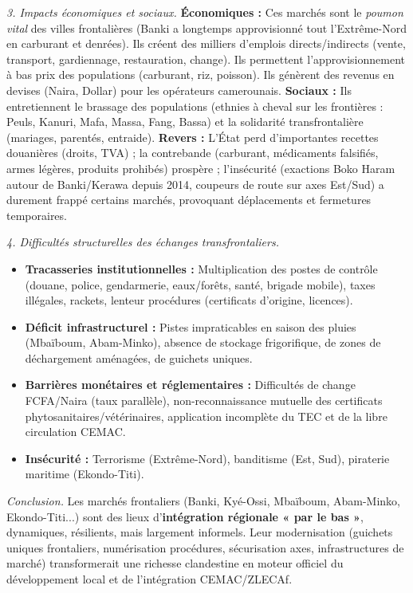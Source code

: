 \documentclass[11pt]{article}
\begin{document}
\begin{exoresolu}
\emph{3. Impacts économiques et sociaux.}
\textbf{Économiques :} Ces marchés sont le \emph{poumon vital} des villes frontalières (Banki a longtemps approvisionné tout l'Extrême-Nord en carburant et denrées). Ils créent des milliers d'emplois directs/indirects (vente, transport, gardiennage, restauration, change). Ils permettent l'approvisionnement à bas prix des populations (carburant, riz, poisson). Ils génèrent des revenus en devises (Naira, Dollar) pour les opérateurs camerounais. \textbf{Sociaux :} Ils entretiennent le brassage des populations (ethnies à cheval sur les frontières : Peuls, Kanuri, Mafa, Massa, Fang, Bassa) et la solidarité transfrontalière (mariages, parentés, entraide). \textbf{Revers :} L'État perd d'importantes recettes douanières (droits, TVA) ; la contrebande (carburant, médicaments falsifiés, armes légères, produits prohibés) prospère ; l'insécurité (exactions Boko Haram autour de Banki/Kerawa depuis 2014, coupeurs de route sur axes Est/Sud) a durement frappé certains marchés, provoquant déplacements et fermetures temporaires.

\emph{4. Difficultés structurelles des échanges transfrontaliers.}
\begin{itemize}
\item \textbf{Tracasseries institutionnelles :} Multiplication des postes de contrôle (douane, police, gendarmerie, eaux/forêts, santé, brigade mobile), taxes illégales, rackets, lenteur procédures (certificats d'origine, licences).
\item \textbf{Déficit infrastructurel :} Pistes impraticables en saison des pluies (Mbaïboum, Abam-Minko), absence de stockage frigorifique, de zones de déchargement aménagées, de guichets uniques.
\item \textbf{Barrières monétaires et réglementaires :} Difficultés de change FCFA/Naira (taux parallèle), non-reconnaissance mutuelle des certificats phytosanitaires/vétérinaires, application incomplète du TEC et de la libre circulation CEMAC.
\item \textbf{Insécurité :} Terrorisme (Extrême-Nord), banditisme (Est, Sud), piraterie maritime (Ekondo-Titi).
\end{itemize}

\emph{Conclusion.} Les marchés frontaliers (Banki, Kyé-Ossi, Mbaïboum, Abam-Minko, Ekondo-Titi...) sont des lieux d'\textbf{intégration régionale « par le bas »}, dynamiques, résilients, mais largement informels. Leur modernisation (guichets uniques frontaliers, numérisation procédures, sécurisation axes, infrastructures de marché) transformerait une richesse clandestine en moteur officiel du développement local et de l'intégration CEMAC/ZLECAf.
\end{exoresolu}
\end{document}
